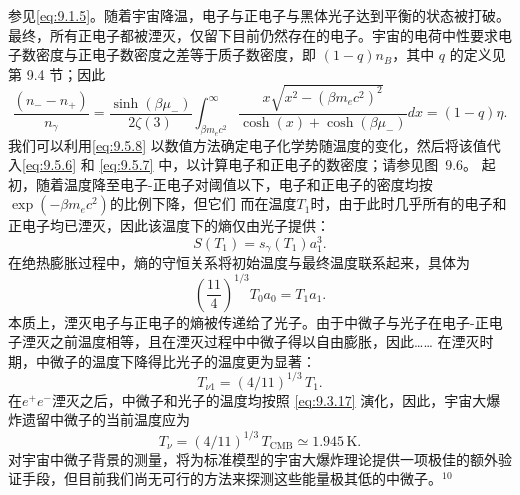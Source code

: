 参见\autoref{eq:9.1.5}。随着宇宙降温，电子与正电子与黑体光子达到平衡的状态被打破。
最终，所有正电子都被湮灭，仅留下目前仍然存在的电子。宇宙的电荷中性要求电子数密度与正电子数密度之差等于质子数密度，即 \((1-q)n_{B}\)，其中 \(q\) 的定义见第 9.4 节；因此
\begin{equation}\tag{9.5.8}\label{eq:9.5.8}
\frac { ( n _ { - } - n _ { + } ) } { n _ { \gamma } } = \frac { \sinh ( \beta \mu _ { - } ) } { 2 \zeta ( 3 ) } \int _ { \beta m _ { e } c ^{2} } ^{\infty} \frac { x \sqrt { x ^{2} - ( \beta m _ { e } c ^{2} ) ^{2} } } { \cosh ( x ) + \cosh ( \beta \mu _ { - } ) } d x = ( 1 - q ) \eta .
\end{equation}
我们可以利用\autoref{eq:9.5.8} 以数值方法确定电子化学势随温度的变化，然后将该值代入\autoref{eq:9.5.6} 和 \autoref{eq:9.5.7} 中，以计算电子和正电子的数密度；请参见图~9.6。
起初，随着温度降至电子-正电子对阈值以下，电子和正电子的密度均按\(\exp(-\beta m_{e}c^{2})\)的比例下降，但它们
而在温度\(T_{1}\)时，由于此时几乎所有的电子和正电子均已湮灭，因此该温度下的熵仅由光子提供：
\begin{equation}\tag{9.5.9}\label{eq:9.5.9}
S ( T _ { 1 } ) = s _ { \gamma } ( T _ { 1 } ) a _ { 1 } ^{3} .
\end{equation}
在绝热膨胀过程中，熵的守恒关系将初始温度与最终温度联系起来，具体为
\begin{equation}\tag{9.5.10}\label{eq:9.5.10}
\left( \frac { 11 } { 4 } \right) ^{1 / 3} T _ { 0 } a _ { 0 } = T _ { 1 } a _ { 1 } .
\end{equation}
本质上，湮灭电子与正电子的熵被传递给了光子。由于中微子与光子在电子-正电子湮灭之前温度相等，且在湮灭过程中中微子得以自由膨胀，因此\ldots\ldots{}
在湮灭时期，中微子的温度下降得比光子的温度更为显著：
\begin{equation}\tag{9.5.11}\label{eq:9.5.11}
T _ { \nu 1 } = ( 4 / 11 ) ^{1 / 3} \, T _ { 1 } .
\end{equation}
在\(e^{+}e^{-}\)湮灭之后，中微子和光子的温度均按照 \autoref{eq:9.3.17} 演化，因此，宇宙大爆炸遗留中微子的当前温度应为
\begin{equation}\tag{9.5.12}\label{eq:9.5.12}
T _ { \nu } = ( 4 / 11 ) ^{1 / 3} \, T _ { \mathrm { C M B } } \simeq 1 . 94 5 \, \mathrm { K } .
\end{equation}
对宇宙中微子背景的测量，将为标准模型的宇宙大爆炸理论提供一项极佳的额外验证手段，但目前我们尚无可行的方法来探测这些能量极其低的中微子。\(^{10}\)
